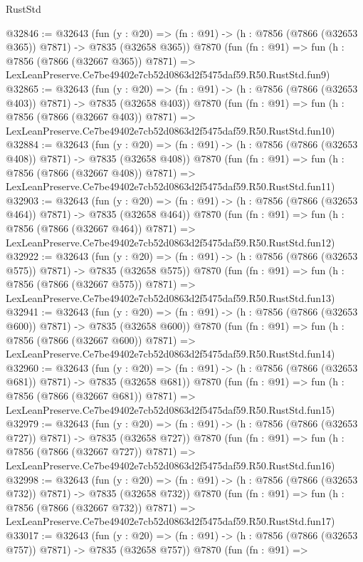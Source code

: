 \begin{lexlean}{RustStd}
\begin{coremodule}
@32846 := @32643
    (fun (y : @20) => (fn : @91) -> (h : @7856 (@7866 (@32653 @365)) @7871) -> @7835 (@32658 @365))
    @7870
    (fun (fn : @91) =>
    fun (h : @7856 (@7866 (@32667 @365)) @7871) =>
    LexLeanPreserve.Ce7be49402e7cb52d0863d2f5475daf59.R50.RustStd.fun9)
@32865 := @32643
    (fun (y : @20) => (fn : @91) -> (h : @7856 (@7866 (@32653 @403)) @7871) -> @7835 (@32658 @403))
    @7870
    (fun (fn : @91) =>
    fun (h : @7856 (@7866 (@32667 @403)) @7871) =>
    LexLeanPreserve.Ce7be49402e7cb52d0863d2f5475daf59.R50.RustStd.fun10)
@32884 := @32643
    (fun (y : @20) => (fn : @91) -> (h : @7856 (@7866 (@32653 @408)) @7871) -> @7835 (@32658 @408))
    @7870
    (fun (fn : @91) =>
    fun (h : @7856 (@7866 (@32667 @408)) @7871) =>
    LexLeanPreserve.Ce7be49402e7cb52d0863d2f5475daf59.R50.RustStd.fun11)
@32903 := @32643
    (fun (y : @20) => (fn : @91) -> (h : @7856 (@7866 (@32653 @464)) @7871) -> @7835 (@32658 @464))
    @7870
    (fun (fn : @91) =>
    fun (h : @7856 (@7866 (@32667 @464)) @7871) =>
    LexLeanPreserve.Ce7be49402e7cb52d0863d2f5475daf59.R50.RustStd.fun12)
@32922 := @32643
    (fun (y : @20) => (fn : @91) -> (h : @7856 (@7866 (@32653 @575)) @7871) -> @7835 (@32658 @575))
    @7870
    (fun (fn : @91) =>
    fun (h : @7856 (@7866 (@32667 @575)) @7871) =>
    LexLeanPreserve.Ce7be49402e7cb52d0863d2f5475daf59.R50.RustStd.fun13)
@32941 := @32643
    (fun (y : @20) => (fn : @91) -> (h : @7856 (@7866 (@32653 @600)) @7871) -> @7835 (@32658 @600))
    @7870
    (fun (fn : @91) =>
    fun (h : @7856 (@7866 (@32667 @600)) @7871) =>
    LexLeanPreserve.Ce7be49402e7cb52d0863d2f5475daf59.R50.RustStd.fun14)
@32960 := @32643
    (fun (y : @20) => (fn : @91) -> (h : @7856 (@7866 (@32653 @681)) @7871) -> @7835 (@32658 @681))
    @7870
    (fun (fn : @91) =>
    fun (h : @7856 (@7866 (@32667 @681)) @7871) =>
    LexLeanPreserve.Ce7be49402e7cb52d0863d2f5475daf59.R50.RustStd.fun15)
@32979 := @32643
    (fun (y : @20) => (fn : @91) -> (h : @7856 (@7866 (@32653 @727)) @7871) -> @7835 (@32658 @727))
    @7870
    (fun (fn : @91) =>
    fun (h : @7856 (@7866 (@32667 @727)) @7871) =>
    LexLeanPreserve.Ce7be49402e7cb52d0863d2f5475daf59.R50.RustStd.fun16)
@32998 := @32643
    (fun (y : @20) => (fn : @91) -> (h : @7856 (@7866 (@32653 @732)) @7871) -> @7835 (@32658 @732))
    @7870
    (fun (fn : @91) =>
    fun (h : @7856 (@7866 (@32667 @732)) @7871) =>
    LexLeanPreserve.Ce7be49402e7cb52d0863d2f5475daf59.R50.RustStd.fun17)
@33017 := @32643
    (fun (y : @20) => (fn : @91) -> (h : @7856 (@7866 (@32653 @757)) @7871) -> @7835 (@32658 @757))
    @7870
    (fun (fn : @91) =>

\end{coremodule}
\end{lexlean}
